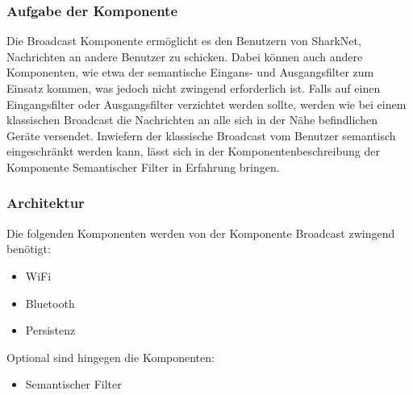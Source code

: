 \subsubsection{Aufgabe der Komponente}
Die Broadcast Komponente ermöglicht es den Benutzern von SharkNet, Nachrichten an andere Benutzer zu schicken. Dabei können auch andere Komponenten, wie etwa der semantische Eingans- und Ausgangsfilter zum Einsatz kommen, was jedoch nicht zwingend erforderlich ist. Falls auf einen Eingangsfilter oder Ausgangsfilter verzichtet werden sollte, werden wie bei einem klassischen Broadcast die Nachrichten an alle sich in der Nähe befindlichen Geräte versendet. Inwiefern der klassische Broadcast vom Benutzer semantisch eingeschränkt werden kann, lässt sich in der Komponentenbeschreibung der Komponente Semantischer Filter in Erfahrung bringen.

\subsubsection{Architektur}

Die folgenden Komponenten werden von der Komponente Broadcast zwingend benötigt:
\begin{itemize}
\item WiFi
\item Bluetooth 
\item Persistenz 
\end{itemize}
Optional sind hingegen die Komponenten:
\begin{itemize}
	\item Semantischer Filter
\end{itemize}


